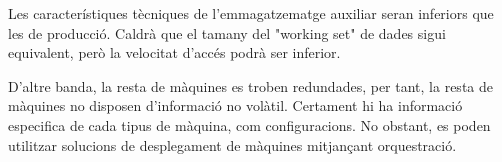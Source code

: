 \documentclass[a4paper, 11pt]{article}
\begin{document}
Les característiques tècniques de l'emmagatzematge auxiliar seran inferiors que les de producció. Caldrà que el tamany del "working set" de dades sigui equivalent, però la velocitat d'accés podrà ser inferior. 


D'altre banda, la resta de màquines es troben redundades, per tant, la resta de màquines no disposen d'informació no volàtil. Certament hi ha informació especifica de cada tipus de màquina, com configuracions. No obstant, es poden utilitzar solucions de desplegament de màquines mitjançant orquestració. 
\end{document}
